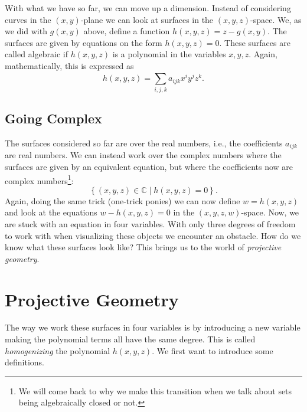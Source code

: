 \documentclass[a4paper]{article}
\theoremstyle{definition}
\theoremstyle{plain}
\newcommand{\C}{\ensuremath{\mathbb{C}}}
\begin{document}
    With what we have so far, we can move up a dimension. Instead of
    considering curves in the $(x, y)$-plane we can look at surfaces in the
    $(x, y, z)$-space. We, as we did with $g(x, y)$ above, define a function
    $h(x, y, z) = z - g(x, y)$. The surfaces are given by equations on the form
    $h(x, y, z) = 0$. These surfaces are called algebraic if $h(x, y, z)$ is a
    polynomial in the variables $x, y, z$. Again, mathematically, this is
    expressed as
    \begin{equation}
        \label{eq:algebraic_surfaces}
        h(x, y, z) = \sum^{}_{i, j, k} a_{ijk}x^iy^jz^k.
    \end{equation}

    \subsection{Going Complex}
    \label{sub:going_complex}

    The surfaces considered so far are over the real numbers, i.e., the
    coefficients $a_{ijk}$ are real numbers. We can instead work over the
    complex numbers where the surfaces are given by an equivalent equation, but
    where the coefficients now are complex numbers\footnote{We will come back
    to why we make this transition when we talk about sets being algebraically
    closed or not.}:
    \begin{equation}
        \left\{ (x, y, z) \in \C \mid h(x, y, z) = 0 \right\}.
    \end{equation}
    Again, doing the same trick (one-trick ponies) we can now define $w = h(x,
    y, z)$ and look at the equations $w - h(x, y, z) = 0$ in the $(x, y, z,
    w)$-space. Now, we are stuck with an equation in four variables. With only
    three degrees of freedom to work with when visualizing these objects we
    encounter an obstacle. How do we know what these surfaces look like? This
    brings us to the world of \emph{projective geometry}.

    \section{Projective Geometry}
    \label{sec:projective_geometry}
    
    The way we work these surfaces in four variables is by introducing a new
    variable making the polynomial terms all have the same degree.  This is
    called \emph{homogenizing} the polynomial $h(x, y, z)$. We first want to
    introduce some definitions.
\end{document}

